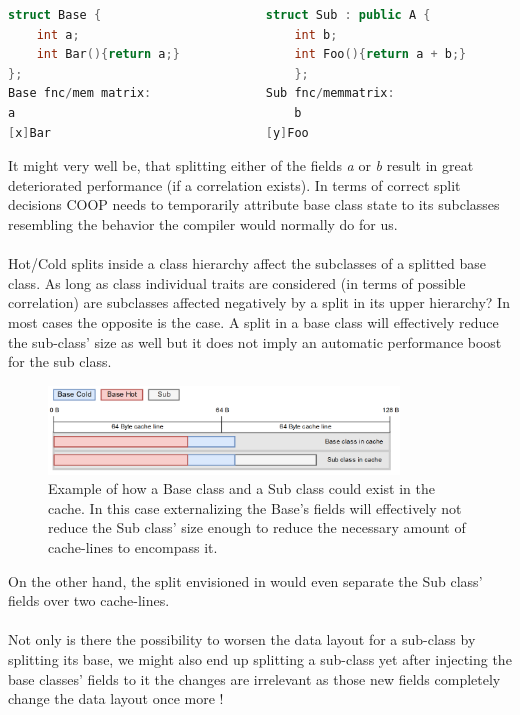 \begin{lstlisting}[language=C++, name={Function/Member matrices for classes related by inheritance.}, label={inheritance_fmm}]
struct Base {						struct Sub : public A {
	int a;								int b;
	int Bar(){return a;}				int Foo(){return a + b;}
};										};
Base fnc/mem matrix:				Sub fnc/memmatrix:
a										b
[x]Bar								[y]Foo
\end{lstlisting}
It might very well be, that splitting either of the fields \textit{a} or \textit{b} result in great deteriorated performance (if a correlation exists). In terms of correct split decisions COOP needs to temporarily attribute base class state to its subclasses resembling the behavior the compiler would normally do for us.\\\\
Hot/Cold splits inside a class hierarchy affect the subclasses of a splitted base class. As long as class individual traits are considered (in terms of possible correlation) are subclasses affected negatively by a split in its upper hierarchy? In most cases the opposite is the case. A split in a base class will effectively reduce the sub-class' size as well but it does not imply an automatic performance boost for the sub class.
\begin{figure}[!htbp]
	\centering
	\includegraphics[width=0.83\textwidth,height=0.25\textwidth]{PICs/inheritance_split}
	\caption{Example of how a Base class and a Sub class could exist in the cache. In this case externalizing the Base's fields will effectively not reduce the Sub class' size enough to reduce the necessary amount of cache-lines to encompass it.}
	\label{inheritance_split}
\end{figure}
On the other hand, the split envisioned in  would even separate the Sub class' fields over two cache-lines.\\\\
Not only is there the possibility to worsen the data layout for a sub-class by splitting its base, we might also end up splitting a sub-class yet after injecting the base classes' fields to it the changes are irrelevant as those new fields completely change the data layout once more !
